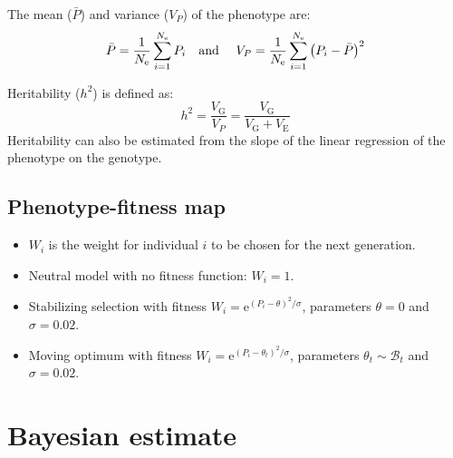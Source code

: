 \documentclass{article}
\newcommand{\e}{\text{e}}
\newcommand{\Ne}{N_{\text{e}}}
\newcommand{\Trait}{P}
\newcommand{\VarPhenotype}{V_{\Trait}}
\newcommand{\VarGenetic}{V_{\mathrm{G}}}
\newcommand{\VarEnv}{V_{\mathrm{E}}}
\begin{document}
The mean ($\bar{\Trait}$) and variance ($\VarPhenotype$) of the phenotype are:
\begin{equation}
    \bar{\Trait} = \frac{1}{\Ne}\sum_{i=1}^{\Ne} \Trait_i \text{\quad and \quad} \VarPhenotype = \frac{1}{\Ne}\sum_{i=1}^{\Ne}\left(\Trait_i - \bar{\Trait} \right)^2 \label{eq:simu-between}
\end{equation}

Heritability ($h^2$) is defined as:
\begin{equation}
    h^2 = \frac{\VarGenetic}{\VarPhenotype} = \frac{\VarGenetic}{\VarGenetic + \VarEnv}\label{eq:simu-heritability}
\end{equation}
Heritability can also be estimated from the slope of the linear regression of the phenotype on the genotype.

\subsection{Phenotype-fitness map}\label{subsec:phenotype-fitness-map}

\begin{itemize}
    \item $W_i$ is the weight for individual $i$ to be chosen for the next generation.
    \item Neutral model with no fitness function: $W_i = 1$.
    \item Stabilizing selection with fitness $W_i = \e^{(\Trait_i - \theta)^2/ \sigma}$, parameters $\theta=0$ and $\sigma=0.02$.
    \item Moving optimum with fitness $W_i = \e^{(\Trait_i - \theta_t)^2/ \sigma}$, parameters $\theta_t \sim \mathcal{B}_t$ and $\sigma=0.02$.
\end{itemize}

\section{Bayesian estimate}\label{sec:bayesian-estimate}
\end{document}
